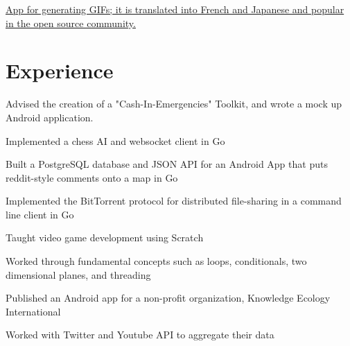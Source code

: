 \documentclass[]{deedy-resume-openfont}
\begin{document}
\href{https://github.com/fenimore/fissure-android}{App for generating GIFs; it is translated into French and Japanese and popular in the open source community.}



\section{Experience}
\begin{tightemize}
\item Advised the creation of a "Cash-In-Emergencies" Toolkit, and wrote a mock up Android application.
\end{tightemize}
\sectionsep

\begin{tightemize}
\item Implemented a chess AI and websocket client in Go
\item Built a PostgreSQL database and JSON API for an Android App that puts reddit-style comments onto a map in Go
\item Implemented the BitTorrent protocol for distributed file-sharing in a command line client in Go
\end{tightemize}
\sectionsep

\begin{tightemize}
\item Taught video game development using Scratch
\item Worked through fundamental concepts such as loops, conditionals, two dimensional planes, and threading
\end{tightemize}
\sectionsep

\begin{tightemize}
\item Published an Android app for a non-profit organization, Knowledge Ecology International
\item Worked with Twitter and Youtube API to aggregate their data
\end{tightemize}
\sectionsep
\end{document}
